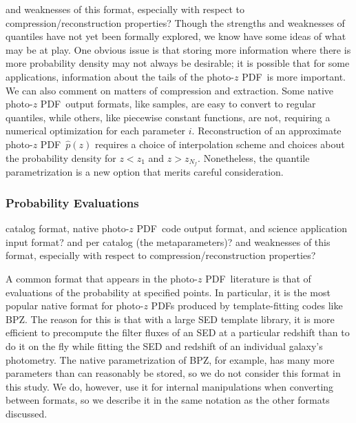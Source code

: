 \documentclass[\docopts]{\docclass}
\newcommand{\pz}{photo-$z$ PDF}
\begin{document}
and weaknesses of this format, especially with respect to 
compression/reconstruction properties?
Though the strengths and weaknesses of quantiles have not yet been formally 
explored, we know have some ideas of what may be at play.  One obvious issue is 
that storing more information where there is more probability density may not 
always be desirable; it is possible that for some applications, information 
about the tails of the \pz\ is more important.  We can also comment on matters 
of compression and extraction.  Some native \pz\ output formats, like samples, 
are easy to convert to regular quantiles, while others, like piecewise constant 
functions, are not, requiring a numerical optimization for each parameter $i$.  
Reconstruction of an approximate \pz\ $\hat{p}(z)$ requires a choice of 
interpolation scheme and choices about the probability density for $z<z_{1}$ 
and $z>z_{N_{f}}$.  Nonetheless, the quantile parametrization is a new option 
that merits careful consideration.

\subsubsection{Probability Evaluations}
\label{sec:grid}


catalog format, native \pz\ code output format, and science application input 
format?
and per catalog (the metaparameters)?
and weaknesses of this format, especially with respect to 
compression/reconstruction properties?

A common format that appears in the \pz\ literature is that of evaluations of 
the probability at specified points.  In particular, it is the most popular 
native format for \pz s produced by template-fitting codes like BPZ.  
\citep{benitez_bayesian_2000}  The reason for this is that with a large SED 
template library, it is more efficient to precompute the filter fluxes of an 
SED at a particular redshift than to do it on the fly while fitting the SED and 
redshift of an individual galaxy's photometry.  The native parametrization of 
BPZ, for example, has many more parameters than can reasonably be stored, so we 
do not consider this format in this study.  We do, however, use it for internal 
manipulations when converting between formats, so we describe it in the same 
notation as the other formats discussed.
\end{document}
